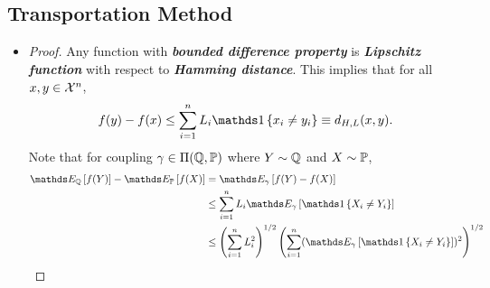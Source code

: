 \documentclass[11pt]{article}
\begin{document}
\subsection{Transportation Method}
\begin{itemize}
\item \begin{proof}
Any  function with \emph{\textbf{bounded difference property}} is \emph{\textbf{Lipschitz function}} with respect to \emph{\textbf{Hamming distance}}. This implies that for all $x, y \in {\mathcal X}^n$,
\begin{align*}
f(y) - f(x) \le \sum_{i=1}^{n}L_i \ind{x_i \neq y_i} \equiv d_{H,L}(x, y).
\end{align*} Note that for coupling $\gamma \in \Pi({\mathbb Q}, {\mathbb P})$ where $Y \sim {\mathbb Q}$ and $X \sim {\mathbb P}$, 
\begin{align*}
\E{\bQ}{f(Y)} - \E{\bP}{f(X)} &= \E{\gamma}{f(Y) - f(X)} \\
&\le \sum_{i=1}^n L_i \E{\gamma}{\ind{X_i \neq Y_i}} \\
&\le \paren{\sum_{i=1}^{n}L_i^2}^{1/2}\paren{\sum_{i=1}^{n}(\E{\gamma}{\ind{X_i \neq Y_i}})^2}^{1/2}
\end{align*}


\end{proof}
\end{itemize}
\end{document}
